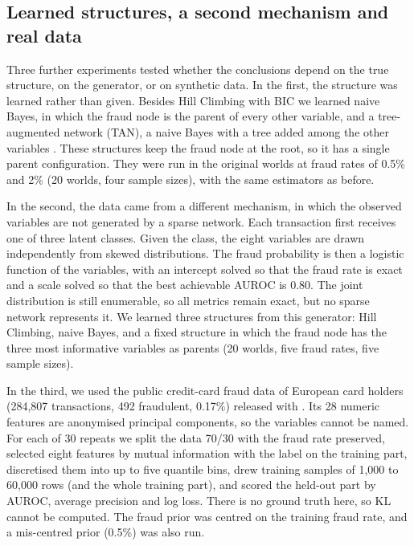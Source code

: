 \documentclass[final,5p,times,authoryear]{elsarticle}
\begin{document}
\subsection{Learned structures, a second mechanism and real data}\label{sec:extra}
Three further experiments tested whether the conclusions depend on the true structure, on the generator, or on synthetic data. In the first, the structure was learned rather than given. Besides Hill Climbing with BIC we learned naive Bayes, in which the fraud node is the parent of every other variable, and a tree-augmented network (TAN), a naive Bayes with a tree added among the other variables \citep{friedman1997}. These structures keep the fraud node at the root, so it has a single parent configuration. They were run in the original worlds at fraud rates of 0.5\% and 2\% (20 worlds, four sample sizes), with the same estimators as before.

In the second, the data came from a different mechanism, in which the observed variables are not generated by a sparse network. Each transaction first receives one of three latent classes. Given the class, the eight variables are drawn independently from skewed distributions. The fraud probability is then a logistic function of the variables, with an intercept solved so that the fraud rate is exact and a scale solved so that the best achievable AUROC is 0.80. The joint distribution is still enumerable, so all metrics remain exact, but no sparse network represents it. We learned three structures from this generator: Hill Climbing, naive Bayes, and a fixed structure in which the fraud node has the three most informative variables as parents (20 worlds, five fraud rates, five sample sizes).

In the third, we used the public credit-card fraud data of European card holders (284,807 transactions, 492 fraudulent, 0.17\%) released with \citet{dalpozzolo2015}. Its 28 numeric features are anonymised principal components, so the variables cannot be named. For each of 30 repeats we split the data 70/30 with the fraud rate preserved, selected eight features by mutual information with the label on the training part, discretised them into up to five quantile bins, drew training samples of 1,000 to 60,000 rows (and the whole training part), and scored the held-out part by AUROC, average precision and log loss. There is no ground truth here, so KL cannot be computed. The fraud prior was centred on the training fraud rate, and a mis-centred prior (0.5\%) was also run.
\end{document}
